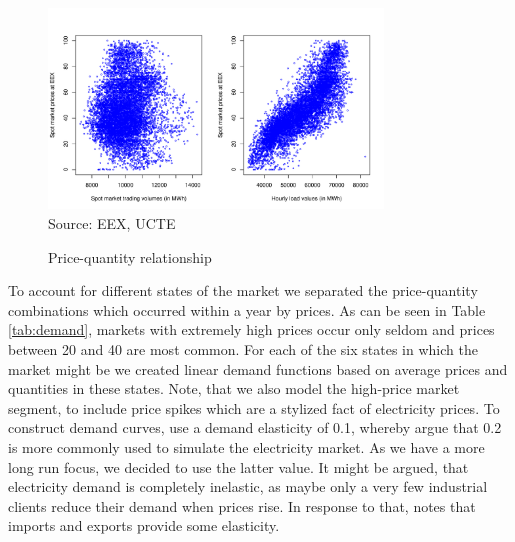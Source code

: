 \begin{figure}[htb]
  \centering
\caption{Price-quantity relationship}
  \includegraphics[width=3.5in]{germandata/pricequant.pdf}
  \label{fig:pricequant}
\\
 \scriptsize Source: EEX, UCTE
\end{figure}

To account for different states of the market we separated the price-quantity combinations which occurred within a year by prices. As can be seen in Table \ref{tab:demand}, markets with extremely high prices occur only seldom and prices between 20 and 40 are most common. For each of the six states in which the market might be we created linear demand functions based on average prices and quantities in these states. Note, that we also model the high-price market segment, to include price spikes which are a stylized fact of electricity prices.  To construct demand curves, \cite{Neuhoff2005} use a demand elasticity of 0.1, whereby \cite{Genc2007} argue that 0.2 is more commonly used to simulate the electricity market. As we have a more long run focus, we decided to use the latter value. It might be argued, that electricity demand is completely inelastic, as maybe only a very few industrial clients reduce their demand when prices rise. In response to that, \cite{Bushnell2003} notes that imports and exports provide some elasticity.

